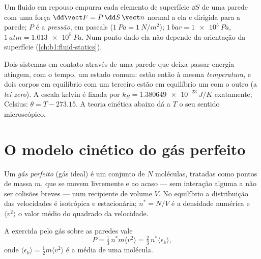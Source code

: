 \begin{definition}[Pressão]\label{def:b1:kinetic-theory:pressure}
Um fluido em repouso empurra cada elemento de superfície $\dd S$ de uma
parede com uma força $\dd\vect F = P\,\dd S\,\vect n$ normal a ela e dirigida para a parede; $P$ é
a \emph{pressão}, em pascals ($\qty{1}{Pa} = \qty{1}{N/m^2}$); $\qty{1}{bar}
= \qty{1e5}{Pa}$, $\qty{1}{atm} = \qty{1.013e5}{Pa}$. Num ponto dado ela não
depende da orientação da superfície (\cref{ch:b1:fluid-statics}).
\end{definition}

\begin{definition}[Temperatura]\label{def:b1:kinetic-theory:temperature}
Dois sistemas em contato através de uma parede que deixa passar energia
atingem, com o tempo, um estado comum: estão então à mesma
\emph{temperatura}, e dois corpos em equilíbrio com um terceiro estão em
equilíbrio um com o outro (a \emph{lei zero}). A escala kelvin é fixada por
$k_B = \qty{1.380649e-23}{J/K}$ exatamente; Celsius: $\theta = T - 273.15$. A
teoria cinética abaixo dá a $T$ o seu sentido microscópico.
\end{definition}

\section{O modelo cinético do gás perfeito}

\begin{definition}\label{def:b1:kinetic-theory:model}
Um \emph{gás perfeito} (gás ideal) é um conjunto de $N$ moléculas,
tratadas como pontos de massa $m$, que se movem livremente e ao acaso ---
sem interação alguma a não ser colisões breves --- num recipiente de volume $V$.
No equilíbrio a distribuição das velocidades é isotrópica e estacionária;
$n^* = N/V$ é a densidade numérica e $\langle v^2\rangle$ o valor médio do
quadrado da velocidade.
\end{definition}

\begin{theorem}\label{thm:b1:kinetic-theory:pressure}
A  exercida pelo gás sobre as paredes vale
\[
P = \tfrac13\,n^*m\langle v^2\rangle = \tfrac23\,n^*\langle\epsilon_k\rangle ,
\]
onde $\langle\epsilon_k\rangle = \tfrac12 m\langle v^2\rangle$ é a  média de uma molécula.
\end{theorem}

